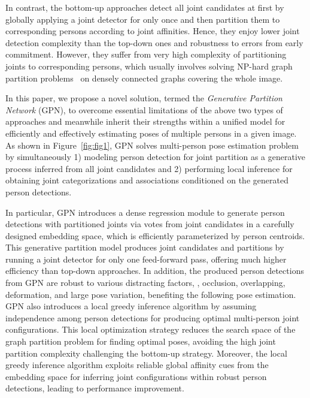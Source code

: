 \documentclass[10pt,twocolumn,letterpaper]{article}
\begin{document}
In contrast, the bottom-up approaches  detect all joint candidates at first by globally applying a joint  detector for only once and then partition them to corresponding persons according to joint affinities. Hence, they enjoy lower joint detection complexity than the top-down ones and  robustness to errors from early commitment. However, they suffer from very high complexity of partitioning joints to corresponding persons, which usually involves solving NP-hard graph partition problems~\cite{hpe:deepercut_eccv16,hpe:deepcut_cvpr16} on densely connected graphs covering the whole image.

In this paper, we propose a novel solution, termed the \emph{Generative Partition Network} (GPN),  to overcome essential limitations of the
above two types of approaches and meanwhile inherit their strengths within a unified model for efficiently and effectively estimating poses of multiple persons in a given image.
As shown in Figure~\ref{fig:fig1}, GPN solves multi-person pose estimation problem by simultaneously
1) modeling person detection for joint partition as a generative process inferred from all joint candidates and
2) performing local inference for obtaining joint categorizations and associations conditioned on the generated person detections.

In particular, GPN introduces a dense regression module to generate person detections with partitioned joints via votes from joint candidates in a carefully designed embedding space, which is efficiently parameterized by person centroids. This generative partition model produces joint candidates and partitions by running a joint detector for only one feed-forward pass, offering much higher efficiency than top-down approaches. In addition, the produced person detections from GPN are robust to various distracting factors, \eg, occlusion, overlapping, deformation, and large pose variation, benefiting the following pose estimation. GPN also introduces a local greedy inference algorithm by assuming independence among person detections for producing optimal multi-person joint configurations. This local optimization strategy reduces the search space of the graph partition problem for finding optimal poses, avoiding the high joint partition complexity challenging the bottom-up strategy. Moreover, the local greedy inference algorithm exploits reliable global affinity cues from the embedding space for inferring joint configurations within robust person detections, leading to performance improvement.
\end{document}
